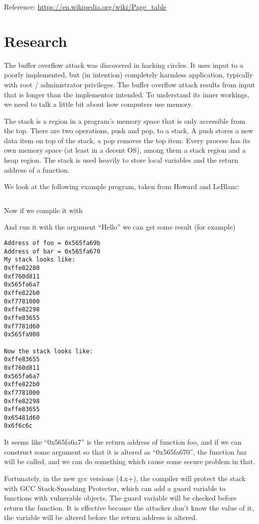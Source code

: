 \documentclass{article}
\begin{document}
Reference: \url{https://en.wikipedia.org/wiki/Page_table}

\section{Research}
The buffer overflow attack was discovered in hacking circles. It uses input to a poorly implemented, but (in intention) completely harmless application, typically with root / administrator privileges. The buffer overflow attack results from input that is longer than the implementor intended. To understand its inner workings, we need to talk a little bit about how computers use memory.

The stack is a region in a program's memory space that is only accessible from the top. There are two operations, push and pop, to a stack. A push stores a new data item on top of the stack, a pop removes the top item. Every process has its own memory space (at least in a decent OS), among them a stack region and a heap region. The stack is used heavily to store local variables and the return address of a function.

We look at the following example program, taken from Howard and LeBlanc:

\inputminted{c}{ex3.c}

Now if we compile it with 

And run it with the argument ``Hello'' we can get some result (for example)

\begin{verbatim}
Address of foo = 0x565fa69b
Address of bar = 0x565fa670
My stack looks like:
0xffe82280
0xf760d811
0x565fa6a7
0xffe822b0
0xf7781000
0xffe82298
0xffe83655
0xf7781d60
0x565fa908

Now the stack looks like:
0xffe83655
0xf760d811
0x565fa6a7
0xffe822b0
0xf7781000
0xffe82298
0xffe83655
0x65481d60
0x6f6c6c
\end{verbatim}

It seems like ``0x565fa6a7'' is the return address of function foo, and if we can construct some argument so that it is altered as ``0x565fa670'', the function bar will be called, and we can do something which cause some secure problem in that.

Fortunately, in the new gcc versions (4.x+), the compiler will protect the stack with GCC Stack-Smashing Protector, which can add a guard variable to functions with vulnerable objects. The guard variable will be checked before return the function. It is effective because the attacker don't know the value of it, the variable will be altered before the return address is altered.
\end{document}
